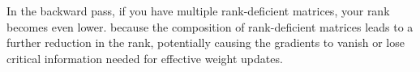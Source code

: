 In the backward pass, if you have multiple rank-deficient matrices, your rank becomes even lower.
because the composition of rank-deficient matrices leads to a further reduction in the rank, potentially causing the gradients to vanish or lose critical information needed for effective weight updates.
